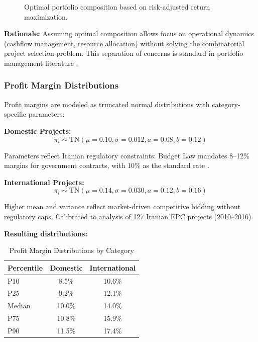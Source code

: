 \begin{figure}[h]
\centering
\resizebox{0.7\columnwidth}{!}{}
\caption{Optimal portfolio composition based on risk-adjusted return maximization.}
\label{fig:portfolio_composition}
\end{figure}

\textbf{Rationale:} Assuming optimal composition allows focus on operational dynamics (cashflow management, resource allocation) without solving the combinatorial project selection problem. This separation of concerns is standard in portfolio management literature \citep{archer1999integrated, cooper2001portfolio}.

\subsubsection{Profit Margin Distributions}

Profit margins are modeled as truncated normal distributions with category-specific parameters:

\textbf{Domestic Projects:}
\begin{equation}
\pi_i \sim \text{TN}(\mu = 0.10, \sigma = 0.012, a = 0.08, b = 0.12)
\end{equation}

Parameters reflect Iranian regulatory constraints: Budget Law mandates 8--12\% margins for government contracts, with 10\% as the standard rate \citep{khanzadi2018integrating}.

\textbf{International Projects:}
\begin{equation}
\pi_i \sim \text{TN}(\mu = 0.14, \sigma = 0.030, a = 0.12, b = 0.16)
\end{equation}

Higher mean and variance reflect market-driven competitive bidding without regulatory caps. Calibrated to \citet{khanzadi2018integrating} analysis of 127 Iranian EPC projects (2010--2016).

\textbf{Resulting distributions:}

\begin{table}[h]
\centering
\small
\caption{Profit Margin Distributions by Category}
\label{tab:profit_margins}
\begin{tabular}{@{}lcc@{}}
\toprule
Percentile & Domestic & International \\
\midrule
P10 & 8.5\% & 10.6\% \\
P25 & 9.2\% & 12.1\% \\
Median & 10.0\% & 14.0\% \\
P75 & 10.8\% & 15.9\% \\
P90 & 11.5\% & 17.4\% \\
\bottomrule
\end{tabular}
\end{table}

